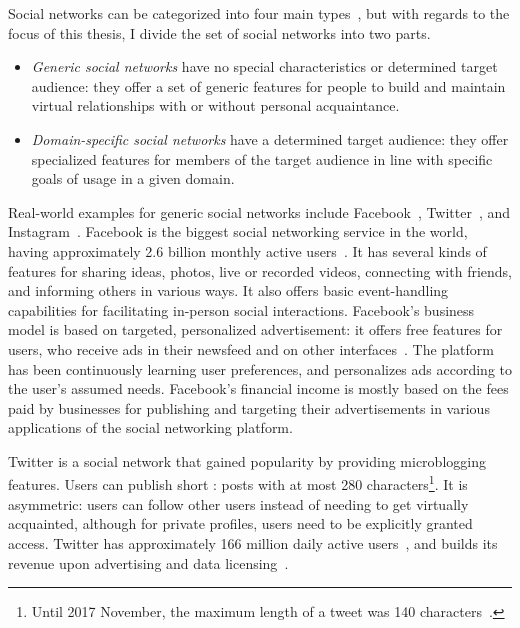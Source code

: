 Social networks can be categorized into four main types~\cite{thelwall2009}, but with regards to the focus of this thesis, I divide the set of social networks into two parts.

\begin{itemize}
\item \emph{Generic social networks} have no special characteristics or determined target audience: they offer a set of generic features for people to build and maintain virtual relationships with or without personal acquaintance.
\item \emph{Domain-specific social networks} have a determined target audience: they offer specialized features for members of the target audience in line with specific goals of usage in a given domain.
\end{itemize}

Real-world examples for generic social networks include Facebook~\cite{aboutfacebook}, Twitter~\cite{abouttwitter}, and Instagram~\cite{aboutinstagram}. Facebook is the biggest social networking service in the world, having approximately 2.6 billion monthly active users~\cite{facebook2020q1report}. It has several kinds of features for sharing ideas, photos, live or recorded videos, connecting with friends, and informing others in various ways. It also offers basic event-handling capabilities for facilitating in-person social interactions. Facebook's business model is based on targeted, personalized advertisement: it offers free features for users, who receive ads in their newsfeed and on other interfaces~\cite{fb-business-model}. The platform has been continuously learning user preferences, and personalizes ads according to the user's assumed needs. Facebook's financial income is mostly based on the fees paid by businesses for publishing and targeting their advertisements in various applications of the social networking platform.

Twitter is a social network that gained popularity by providing microblogging features. Users can publish short : posts with at most 280 characters\footnote{Until 2017 November, the maximum length of a tweet was 140 characters~\cite{twitter-doubling-character-limit}.}. It is asymmetric: users can follow other users instead of needing to get virtually acquainted, although for private profiles, users need to be explicitly granted access. Twitter has approximately 166 million daily active users~\cite{twitter2020q1report}, and builds its revenue upon advertising and data licensing~\cite{twitter-business-model}.

